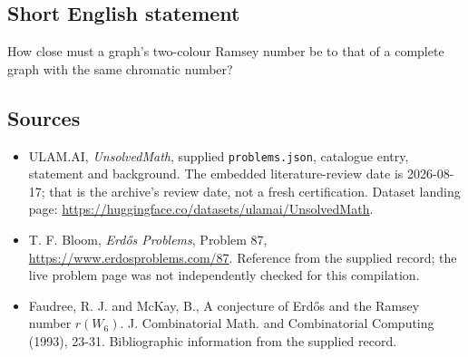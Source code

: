 \documentclass[11pt,a4paper]{article}
\begin{document}
\subsection{Short English statement}

How close must a graph's two-colour Ramsey number be to that of a complete graph with the same chromatic number?

\subsection{Sources}

{\small

\begin{itemize}

\item[\hypertarget{source:statement:1}{S1}] ULAM.AI, \emph{UnsolvedMath}, supplied \texttt{problems.json}, catalogue entry, statement and background. The embedded literature-review date is 2026-08-17; that is the archive’s review date, not a fresh certification. Dataset landing page: \url{https://huggingface.co/datasets/ulamai/UnsolvedMath}.

\item[\hypertarget{source:statement:2}{S2}] T. F. Bloom, \emph{Erdős Problems}, Problem 87, \url{https://www.erdosproblems.com/87}. Reference from the supplied record; the live problem page was not independently checked for this compilation.

\item[\hypertarget{source:statement:3}{S3}] Faudree, R. J. and McKay, B., A conjecture of Erd\H{o}s and the Ramsey number $r(W_6)$. J. Combinatorial Math. and Combinatorial Computing (1993), 23-31. Bibliographic information from the supplied record.

\end{itemize}

}

\label{end:statement}
\end{document}
